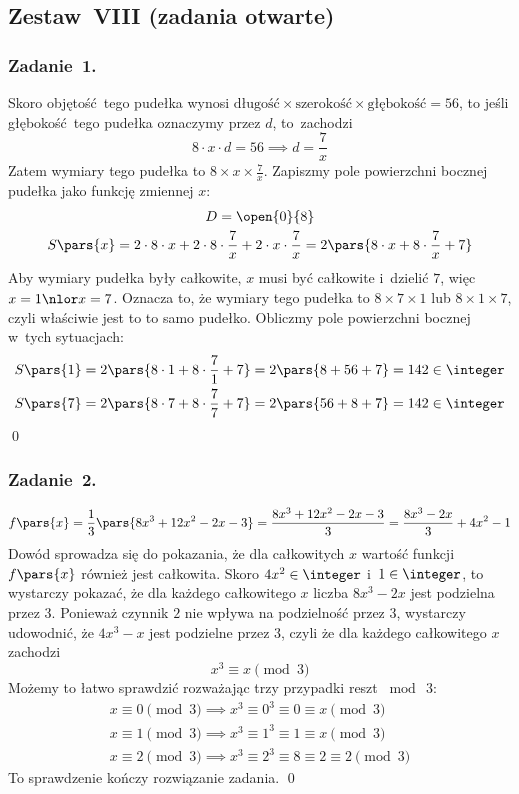 \subsection*{Zestaw~VIII (zadania otwarte)}
\subsubsection*{Zadanie~1.}
Skoro objętość tego pudełka wynosi \(\text{długość} \times \text{szerokość} \times \text{głębokość} = 56\), to jeśli głębokość tego pudełka oznaczymy przez \(d\), to~zachodzi
\begin{equation*}
    8 \cdot x \cdot d = 56 \implies d = \frac{7}{x}
\end{equation*}
Zatem wymiary tego pudełka to \(8 \times x \times \frac{7}{x}\). Zapiszmy pole powierzchni bocznej pudełka jako funkcję zmiennej \(x\):
\begin{gather*}
    D = \open{0}{8}\\
    S\pars{x} = 2 \cdot 8 \cdot x + 2 \cdot 8 \cdot \frac{7}{x} + 2 \cdot x \cdot \frac{7}{x}
        = 2\pars{8 \cdot x + 8 \cdot \frac{7}{x} + 7}
\end{gather*}
Aby wymiary pudełka były całkowite, \(x\) musi być całkowite i~dzielić \(7\), więc \(x = 1 \nlor x = 7\). Oznacza to, że wymiary tego pudełka to \(8 \times 7 \times 1\) lub \(8 \times 1 \times 7\), czyli właściwie jest to to samo pudełko. Obliczmy pole powierzchni bocznej w~tych sytuacjach:
\begin{gather*}
    S\pars{1} = 2\pars{8 \cdot 1 + 8 \cdot \frac{7}{1} + 7} = 2\pars{8 + 56 + 7} = 142 \in \integer\\
    S\pars{7} = 2\pars{8 \cdot 7 + 8 \cdot \frac{7}{7} + 7} = 2\pars{56 + 8 + 7} = 142 \in \integer
\end{gather*}
\qed
\subsubsection*{Zadanie~2.}
\begin{equation*}
    f\pars{x} = \frac{1}{3}\pars{8x^3 + 12x^2 - 2x - 3} = \frac{8x^3 + 12x^2 - 2x - 3}{3} = \frac{8x^3 - 2x}{3} + 4x^2 - 1
\end{equation*}
Dowód sprowadza się do pokazania, że dla całkowitych \(x\) wartość funkcji \(f\pars{x}\) również jest całkowita. Skoro \(4x^2 \in \integer\) i~\(1 \in \integer\), to wystarczy pokazać, że dla każdego całkowitego \(x\) liczba \(8x^3 - 2x\) jest podzielna przez \(3\). Ponieważ czynnik \(2\) nie wpływa na podzielność przez \(3\), wystarczy udowodnić, że \(4x^3 - x\) jest podzielne przez \(3\), czyli że dla każdego całkowitego \(x\) zachodzi
\begin{equation*}
    x^3 \equiv x \pmod{3}
\end{equation*}
Możemy to łatwo sprawdzić rozważając trzy przypadki reszt \(\bmod\ 3\):
\begin{gather*}
    x \equiv 0 \pmod{3} \implies x^3 \equiv 0^3 \equiv 0 \equiv x \pmod{3}\\
    x \equiv 1 \pmod{3} \implies x^3 \equiv 1^3 \equiv 1 \equiv x \pmod{3}\\
    x \equiv 2 \pmod{3} \implies x^3 \equiv 2^3 \equiv 8 \equiv 2 \equiv 2 \pmod{3}
\end{gather*}
To sprawdzenie kończy rozwiązanie zadania.
\qed
